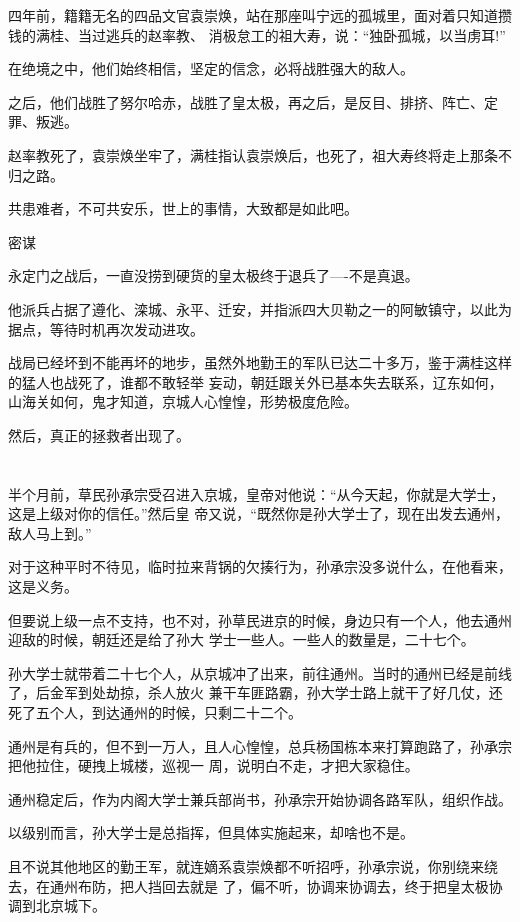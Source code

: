 \documentclass[11pt,a4paper,onecolumn]{article}
\begin{document}
四年前，籍籍无名的四品文官袁崇焕，站在那座叫宁远的孤城里，面对着只知道攒钱的满桂、当过逃兵的赵率教、
消极怠工的祖大寿，说：``独卧孤城，以当虏耳!''

在绝境之中，他们始终相信，坚定的信念，必将战胜强大的敌人。

之后，他们战胜了努尔哈赤，战胜了皇太极，再之后，是反目、排挤、阵亡、定罪、叛逃。

赵率教死了，袁崇焕坐牢了，满桂指认袁崇焕后，也死了，祖大寿终将走上那条不归之路。

共患难者，不可共安乐，世上的事情，大致都是如此吧。

密谋

永定门之战后，一直没捞到硬货的皇太极终于退兵了----不是真退。

他派兵占据了遵化、滦城、永平、迁安，并指派四大贝勒之一的阿敏镇守，以此为据点，等待时机再次发动进攻。

战局已经坏到不能再坏的地步，虽然外地勤王的军队已达二十多万，鉴于满桂这样的猛人也战死了，谁都不敢轻举
妄动，朝廷跟关外已基本失去联系，辽东如何，山海关如何，鬼才知道，京城人心惶惶，形势极度危险。

然后，真正的拯救者出现了。

\section[\thesection]{}

半个月前，草民孙承宗受召进入京城，皇帝对他说：``从今天起，你就是大学士，这是上级对你的信任。''然后皇
帝又说，``既然你是孙大学士了，现在出发去通州，敌人马上到。''

对于这种平时不待见，临时拉来背锅的欠揍行为，孙承宗没多说什么，在他看来，这是义务。

但要说上级一点不支持，也不对，孙草民进京的时候，身边只有一个人，他去通州迎敌的时候，朝廷还是给了孙大
学士一些人。一些人的数量是，二十七个。

孙大学士就带着二十七个人，从京城冲了出来，前往通州。当时的通州已经是前线了，后金军到处劫掠，杀人放火
兼干车匪路霸，孙大学士路上就干了好几仗，还死了五个人，到达通州的时候，只剩二十二个。

通州是有兵的，但不到一万人，且人心惶惶，总兵杨国栋本来打算跑路了，孙承宗把他拉住，硬拽上城楼，巡视一
周，说明白不走，才把大家稳住。

通州稳定后，作为内阁大学士兼兵部尚书，孙承宗开始协调各路军队，组织作战。

以级别而言，孙大学士是总指挥，但具体实施起来，却啥也不是。

且不说其他地区的勤王军，就连嫡系袁崇焕都不听招呼，孙承宗说，你别绕来绕去，在通州布防，把人挡回去就是
了，偏不听，协调来协调去，终于把皇太极协调到北京城下。
\end{document}
